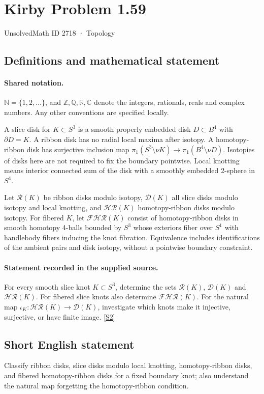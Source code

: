 \documentclass[11pt]{article}
\newcommand{\sref}[2]{\hyperlink{source:#1:#2}{[S#2]}}
\begin{document}
\setcounter{section}{2717}
\section{Kirby Problem 1.59}\label{2718}
{\small\sffamily UnsolvedMath ID 2718 · Topology}
\subsection{Definitions and mathematical statement}

\paragraph{Shared notation.}$\mathbb N=\{1,2,\ldots\}$, and $\mathbb Z,\mathbb Q,\mathbb R,\mathbb C$ denote the integers, rationals, reals and complex numbers. Any other conventions are specified locally.


A slice disk for $K\subset S^3$ is a smooth properly embedded disk $D\subset B^4$ with $\partial D=K$. A ribbon disk has no radial local maxima after isotopy. A homotopy-ribbon disk has surjective inclusion map $\pi_1(S^3\setminus\nu K)\to\pi_1(B^4\setminus\nu D)$. Isotopies of disks here are not required to fix the boundary pointwise. Local knotting means interior connected sum of the disk with a smoothly embedded 2-sphere in $S^4$.

Let $\mathcal R(K)$ be ribbon disks modulo isotopy, $\mathcal D(K)$ all slice disks modulo isotopy and local knotting, and $\mathcal{HR}(K)$ homotopy-ribbon disks modulo isotopy. For fibered $K$, let $\mathcal{FHR}(K)$ consist of homotopy-ribbon disks in smooth homotopy 4-balls bounded by $S^3$ whose exteriors fiber over $S^1$ with handlebody fibers inducing the knot fibration. Equivalence includes identifications of the ambient pairs and disk isotopy, without a pointwise boundary constraint.
\paragraph{Statement recorded in the supplied source.}
For every smooth slice knot $K\subset S^3$, determine the sets $\mathcal R(K)$, $\mathcal D(K)$ and $\mathcal{HR}(K)$. For fibered slice knots also determine $\mathcal{FHR}(K)$. For the natural map $\iota_K:\mathcal{HR}(K)\to\mathcal D(K)$, investigate which knots make it injective, surjective, or have finite image. \sref{2718}{2}

\subsection{Short English statement}
Classify ribbon disks, slice disks modulo local knotting, homotopy-ribbon disks, and fibered homotopy-ribbon disks for a fixed boundary knot; also understand the natural map forgetting the homotopy-ribbon condition.
\end{document}

